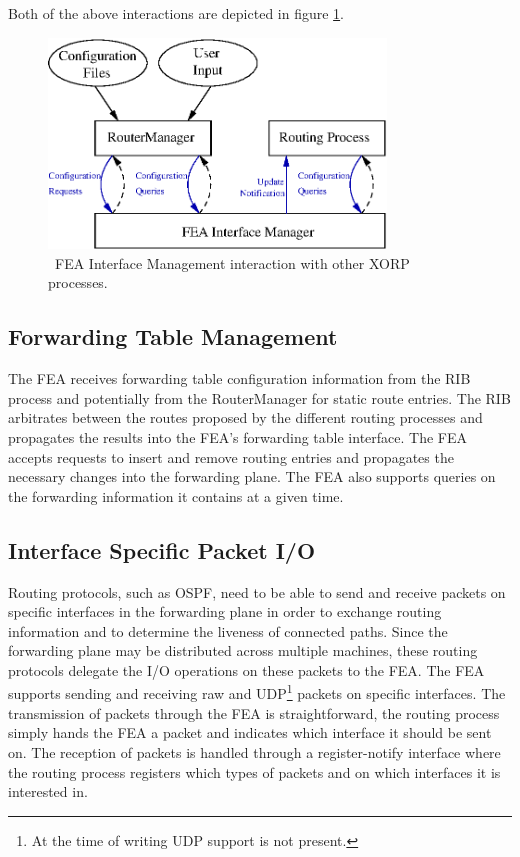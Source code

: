 \documentclass[11pt]{article}
\begin{document}
Both of the above interactions are depicted in figure \ref{fig:ifmgmt}.

\begin{figure}
\centerline{\includegraphics[width=0.80\textwidth]{figs/ifmgmt}}
\caption{\label{fig:ifmgmt} \
FEA Interface Management interaction with other XORP processes. \
}
\end{figure}

\subsection{Forwarding Table Management}

The FEA receives forwarding table configuration information from the
RIB process and potentially from the RouterManager for static route
entries.  The RIB arbitrates between the routes proposed by the
different routing processes and propagates the results into the FEA's
forwarding table interface.  The FEA accepts requests to insert and
remove routing entries and propagates the necessary changes into the
forwarding plane.  The FEA also supports queries on the forwarding
information it contains at a given time.

\subsection{Interface Specific Packet I/O}

Routing protocols, such as OSPF, need to be able to send and receive
packets on specific interfaces in the forwarding plane in order to
exchange routing information and to determine the liveness of
connected paths.  Since the forwarding plane may be distributed across
multiple machines, these routing protocols delegate the I/O operations
on these packets to the FEA.  The FEA supports sending and receiving
raw and UDP\footnote{At the time of writing UDP support is not
present.}  packets on specific interfaces.  The transmission of
packets through the FEA is straightforward, the routing process simply
hands the FEA a packet and indicates which interface it should be sent
on.  The reception of packets is handled through a register-notify
interface where the routing process registers which types of packets
and on which interfaces it is interested in.
\end{document}
